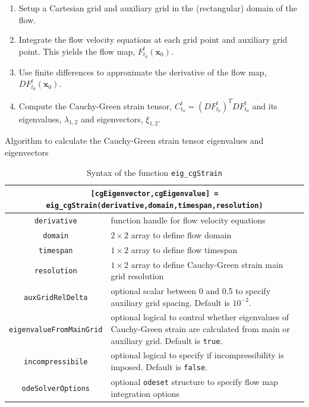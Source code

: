 \documentclass{article}
\begin{document}
\begin{table}
\begin{enumerate}
\item Setup a Cartesian grid and auxiliary grid in the (rectangular) domain of the flow.
\item Integrate the flow velocity equations at each grid point and auxiliary grid point. This yields the flow map, $F_{t_0}^t(\boldsymbol x_0)$.
\item Use finite differences to approximate the derivative of the flow map, $D F_{t_0}^t(\boldsymbol x_0)$.
\item Compute the Cauchy-Green strain tensor, $C_{t_0}^t = \left(D F_{t_0}^t\right)^T D F_{t_0}^t$ and its eigenvalues, $\lambda_{1,2}$ and eigenvectors, $\xi_{1,2}$.
\end{enumerate}
\caption{Algorithm to calculate the Cauchy-Green strain tensor eigenvalues and eigenvectors}
\label{t:Cauchy-Green algorithm}
\end{table}

\begin{table}
\begin{center}
\begin{tabular}{|c|p{}|}
\hline \hline
\multicolumn{2}{|p{\textwidth}|}{\lstinline![cgEigenvector,cgEigenvalue] = eig_cgStrain(derivative,domain,timespan,resolution)!}\\
\hline
\lstinline!derivative! & function handle for flow velocity equations\\
\hline
\lstinline!domain! & $2 \times 2$ array to define flow domain\\
\hline
\lstinline!timespan! & $1 \times 2$ array to define flow timespan\\
\hline
\lstinline!resolution! & $1 \times 2$ array to define Cauchy-Green strain main grid resolution\\
\hline
\lstinline!auxGridRelDelta! & optional scalar between 0 and 0.5 to specify auxiliary grid spacing. Default is $10^{-2}$.\\
\hline
\lstinline!eigenvalueFromMainGrid! & optional logical to control whether eigenvalues of Cauchy-Green strain are calculated from main or auxiliary grid. Default is \lstinline!true!.\\
\hline
\lstinline!incompressibile! & optional logical to specify if incompressibility is imposed. Default is  \lstinline!false!.\\
\hline
\lstinline!odeSolverOptions! & optional \lstinline!odeset! structure to specify flow map integration options\\
\hline \hline
\end{tabular}
\caption{Syntax of the function \lstinline!eig_cgStrain!}
\label{t:eig_cgStrain syntax}
\end{center}
\end{table}
\end{document}

